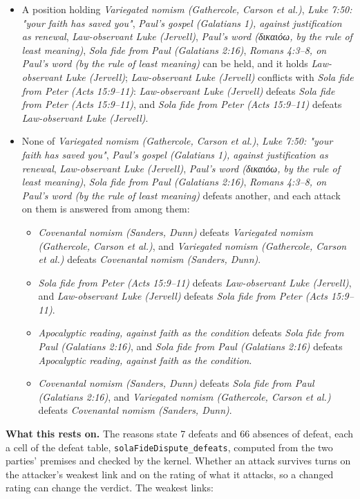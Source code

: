 \documentclass[11pt]{article}
\begin{document}
\begin{itemize}
\item A position holding \emph{Variegated nomism (Gathercole, Carson et al.)}, \emph{Luke 7:50: "your faith has saved you"}, \emph{Paul's gospel (Galatians 1), against justification as renewal}, \emph{Law-observant Luke (Jervell)}, \emph{Paul's word (δικαιόω, by the rule of least meaning)}, \emph{Sola fide from Paul (Galatians 2:16)}, \emph{Romans 4:3–8, on Paul's word (by the rule of least meaning)} can be held, and it holds \emph{Law-observant Luke (Jervell)}; \emph{Law-observant Luke (Jervell)} conflicts with \emph{Sola fide from Peter (Acts 15:9–11)}: \emph{Law-observant Luke (Jervell)} defeats \emph{Sola fide from Peter (Acts 15:9–11)}, and \emph{Sola fide from Peter (Acts 15:9–11)} defeats \emph{Law-observant Luke (Jervell)}.
\item None of \emph{Variegated nomism (Gathercole, Carson et al.)}, \emph{Luke 7:50: "your faith has saved you"}, \emph{Paul's gospel (Galatians 1), against justification as renewal}, \emph{Law-observant Luke (Jervell)}, \emph{Paul's word (δικαιόω, by the rule of least meaning)}, \emph{Sola fide from Paul (Galatians 2:16)}, \emph{Romans 4:3–8, on Paul's word (by the rule of least meaning)} defeats another, and each attack on them is answered from among them:
\begin{itemize}
\item \emph{Covenantal nomism (Sanders, Dunn)} defeats \emph{Variegated nomism (Gathercole, Carson et al.)}, and \emph{Variegated nomism (Gathercole, Carson et al.)} defeats \emph{Covenantal nomism (Sanders, Dunn)}.
\item \emph{Sola fide from Peter (Acts 15:9–11)} defeats \emph{Law-observant Luke (Jervell)}, and \emph{Law-observant Luke (Jervell)} defeats \emph{Sola fide from Peter (Acts 15:9–11)}.
\item \emph{Apocalyptic reading, against faith as the condition} defeats \emph{Sola fide from Paul (Galatians 2:16)}, and \emph{Sola fide from Paul (Galatians 2:16)} defeats \emph{Apocalyptic reading, against faith as the condition}.
\item \emph{Covenantal nomism (Sanders, Dunn)} defeats \emph{Sola fide from Paul (Galatians 2:16)}, and \emph{Variegated nomism (Gathercole, Carson et al.)} defeats \emph{Covenantal nomism (Sanders, Dunn)}.
\end{itemize}
\end{itemize}
\par\noindent\textbf{What this rests on.} The reasons state 7 defeats and 66 absences of defeat, each a cell of the defeat table, \texttt{sola\allowbreak{}Fide\allowbreak{}Dispute\_\allowbreak{}defeats}, computed from the two parties' premises and checked by the kernel. Whether an attack survives turns on the attacker's weakest link and on the rating of what it attacks, so a changed rating can change the verdict. The weakest links:
\end{document}

